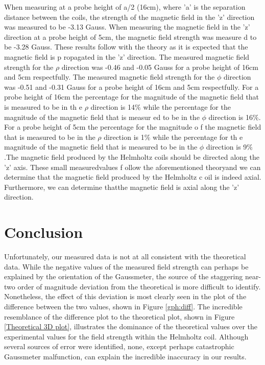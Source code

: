 \documentclass[a4paper]{article}
\begin{document}
\qq When measuring at a probe height of a/2 (16cm), where 'a' is the separation
distance between the coils, the strength of the magnetic field in the 'z'
direction was measured to be -3.13 Gauss. When measuring the magnetic field in
the 'z' direction at a probe height of 5cm, the magnetic field strength was
measure d to be -3.28 Gauss. These results follow with the theory as it is
expected that the magnetic field is p ropagated in the 'z' direction. The
measured magnetic field strength for the $\rho$ direction was -0.46 and -0.05
Gauss for a probe height of 16cm and 5cm respectfully. The measured magnetic
field strength for the $\phi$ direction was -0.51 and -0.31 Gauss for a probe
height of 16cm and 5cm respectfully. For a probe height of 16cm the percentage
for the magnitude of the magnetic field that is measured to be in th e $\rho$
direction is 14$\%$ while the percentage for the magnitude of the magnetic field
that is measur ed to be in the $\phi$ direction is 16$\%$. For a probe height of
5cm the percentage for the magnitude o f the magnetic field that is measured to
be in the $\rho$ direction is 1$\%$ while the percentage for th e magnitude of
the magnetic field that is measured to be in the $\phi$ direction is 9$\%$.The
magnetic field produced by the Helmholtz coils should be directed along the 'z'
axis. These small measuredvalues f ollow the aforementioned theoryand we can
determine that the magnetic field produced by the Helmholtz c oil is indeed
axial. Furthermore, we can determine thatthe magnetic field is axial along the
'z' direction.


\section{Conclusion}
\qq Unfortunately, our measured data is not at all consistent with the
theoretical data. While the negative values of the measured field strength can
perhaps be explained by the orientation of the Gaussmeter, the source of the
staggering near-two order of magnitude deviation from the theoretical is more
difficult to identify. Nonetheless, the effect of this deviation is most
clearly seen in the plot of the difference between the two values, shown in
Figure \ref{gph:diff}. The incredible resemblance of the difference plot to the
theoretical plot, shown in Figure \ref{Theoretical 3D plot}, illustrates the
dominance of the theoretical values over the experimental values for the field
strength within the Helmholtz coil. Although several sources of error were
identified, none, except perhaps catastrophic Gaussmeter malfunction, can
explain the incredible inaccuracy in our results.
\end{document}
